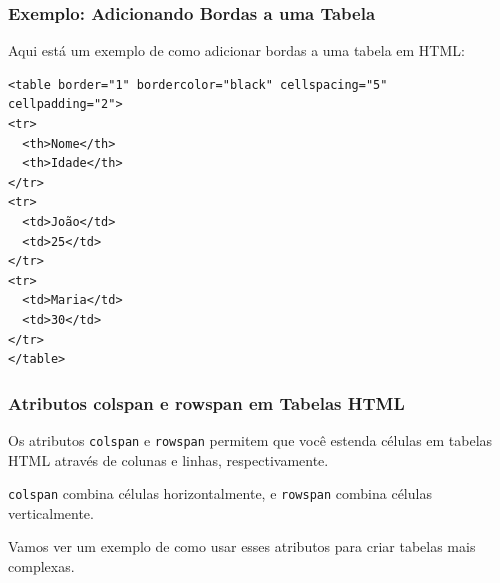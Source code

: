 \documentclass{beamer}
\begin{document}
\begin{frame}[fragile]
  \frametitle{Exemplo: Adicionando Bordas a uma Tabela}

  Aqui está um exemplo de como adicionar bordas a uma tabela em HTML:

  \begin{verbatim}
<table border="1" bordercolor="black" cellspacing="5"
cellpadding="2">
<tr>
  <th>Nome</th>
  <th>Idade</th>
</tr>
<tr>
  <td>João</td>
  <td>25</td>
</tr>
<tr>
  <td>Maria</td>
  <td>30</td>
</tr>
</table>
  \end{verbatim}

\end{frame}


\begin{frame}
  \frametitle{Atributos colspan e rowspan em Tabelas HTML}

  Os atributos \texttt{colspan} e \texttt{rowspan} permitem que você estenda células em tabelas HTML através de colunas e linhas, respectivamente.

  \texttt{colspan} combina células horizontalmente, e \texttt{rowspan} combina células verticalmente.

  Vamos ver um exemplo de como usar esses atributos para criar tabelas mais complexas.
\end{frame}
\end{document}
